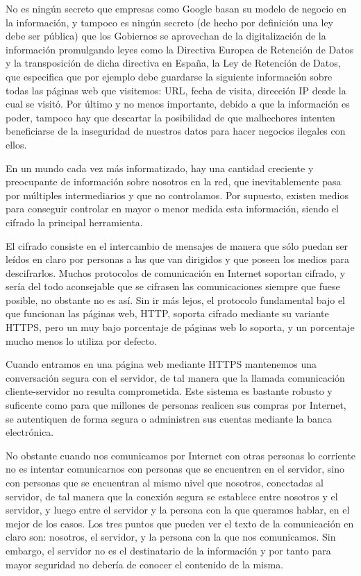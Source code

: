 No es ningún secreto que empresas como Google basan su modelo de negocio en la información, y tampoco es ningún secreto (de hecho por definición una ley debe ser pública) que los Gobiernos se aprovechan de la digitalización de la información promulgando leyes como la Directiva Europea de Retención de Datos y la transposición de dicha directiva en España, la Ley de Retención de Datos, que especifica que por ejemplo debe guardarse la siguiente información sobre todas las páginas web que visitemos: URL, fecha de visita, dirección IP desde la cual se visitó. Por último y no menos importante, debido a que la información es poder, tampoco hay que descartar la posibilidad de que malhechores intenten beneficiarse de la inseguridad de nuestros datos para hacer negocios ilegales con ellos.

En un mundo cada vez más informatizado, hay una cantidad creciente y preocupante de información sobre nosotros en la red, que inevitablemente pasa por múltiples intermediarios y que no controlamos. Por supuesto, existen medios para conseguir controlar en mayor o menor medida esta información, siendo el cifrado la principal herramienta.

El cifrado consiste en el intercambio de mensajes de manera que sólo puedan ser leídos en claro por personas a las que van dirigidos y que poseen los medios para descifrarlos. Muchos protocolos de comunicación en Internet soportan cifrado, y sería del todo aconsejable que se cifrasen las comunicaciones siempre que fuese posible, no obstante no es así. Sin ir más lejos, el protocolo fundamental bajo el que funcionan las páginas web, HTTP, soporta cifrado mediante su variante HTTPS, pero un muy bajo porcentaje de páginas web lo soporta, y un porcentaje mucho menos lo utiliza por defecto.

Cuando entramos en una página web mediante HTTPS mantenemos una conversación segura con el servidor, de tal manera que la llamada comunicación cliente-servidor no resulta comprometida. Este sistema es bastante robusto y suficente como para que millones de personas realicen sus compras por Internet, se autentiquen de forma segura o administren sus cuentas mediante la banca electrónica.

No obstante cuando nos comunicamos por Internet con otras personas lo corriente no es intentar comunicarnos con personas que se encuentren en el servidor, sino con personas que se encuentran al mismo nivel que nosotros, conectadas al servidor, de tal manera que la conexión segura se establece entre nosotros y el servidor, y luego entre el servidor y la persona con la que queramos hablar, en el mejor de los casos. Los tres puntos que pueden ver el texto de la comunicación en claro son: nosotros, el servidor, y la persona con la que nos comunicamos. Sin embargo, el servidor no es el destinatario de la información y por tanto para mayor seguridad no debería de conocer el contenido de la misma.


